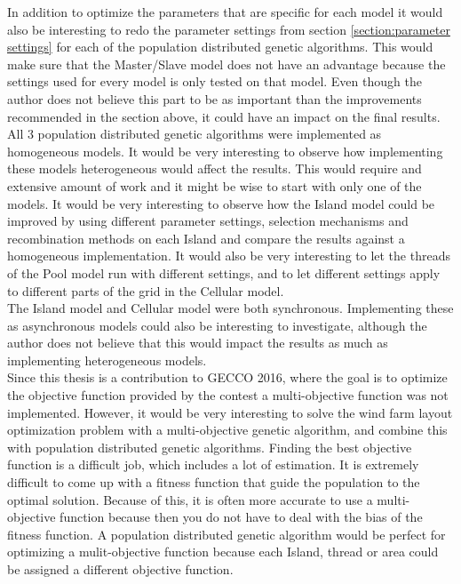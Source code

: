 \noindent In addition to optimize the parameters that are specific for each model it would also be interesting to redo the parameter settings from section \ref{section:parameter settings} for each of the population distributed genetic algorithms. This would make sure that the Master/Slave model does not have an advantage because the settings used for every model is only tested on that model. Even though the author does not believe this part to be as important than the improvements  recommended in the section above, it could have an impact on the final results. \\


\noindent All 3 population distributed genetic algorithms were implemented as homogeneous models. It would be very interesting to observe how implementing these models heterogeneous would affect the results. This would require and extensive amount of work and it might be wise to start with only one of the models. It would be very interesting to observe how the Island model could be improved by using different parameter settings, selection mechanisms and recombination methods on each Island and compare the results against a homogeneous implementation. It would also be very interesting to let the threads of the Pool model run with different settings, and to let different settings apply to different parts of the grid in the Cellular model.\\


\noindent The Island model and Cellular model were both synchronous. Implementing these as asynchronous models could also be interesting to investigate, although the author does not believe that this would impact the results as much as implementing heterogeneous models.\\


\noindent Since this thesis is a contribution to GECCO 2016, where the goal is to optimize the objective function provided by the contest a multi-objective function was not implemented. However, it would be very interesting to solve the wind farm layout optimization problem with a multi-objective genetic algorithm, and combine this with population distributed genetic algorithms. Finding the best objective function is a difficult job, which includes a lot of estimation. It is extremely difficult to come up with a fitness function that guide the population to the optimal solution. Because of this, it is often more accurate to use a multi-objective function because then you do not have to deal with the bias of the fitness function. A population distributed genetic algorithm would be perfect for optimizing a mulit-objective function because each Island, thread or area could be assigned a different objective function.\\


